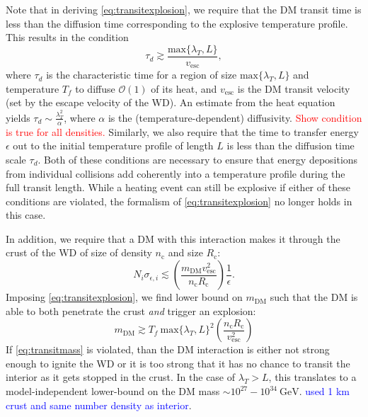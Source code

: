 \documentclass[twocolumn,showpacs,preprintnumbers,amsmath,amssymb,prd]{revtex4}
\newcommand{\OO}{\mathcal{O}}
\newcommand{\GeV}{\text{GeV}}
\def\r{\right)}
\def\l{\left(}
\begin{document}
Note that in deriving \eqref{eq:transitexplosion}, we require that the DM transit time is less than the diffusion time corresponding to the explosive temperature profile. This results in the condition
\begin{equation}
\tau_d \gtrsim \frac{\text{max}\{\lambda_T, L\}}{v_\text{esc}},
\end{equation}
where $\tau_d$ is the characteristic time for a region of size $\text{max}\{\lambda_T, L\}$ and temperature $T_f$ to diffuse $\OO(1)$ of its heat, and $v_\text{esc}$ is the DM transit velocity (set by the escape velocity of the WD). An estimate from the heat equation yields $\tau_d \sim \frac{\lambda_T^2}{\alpha}$, where $\alpha$ is the (temperature-dependent) diffusivity. \textcolor{red}{Show condition is true for all densities.} Similarly, we also require that the time to transfer energy $\epsilon$ out to the initial temperature profile of length $L$ is less than the diffusion time scale $\tau_d$. Both of these conditions are necessary to ensure that energy depositions from individual collisions add coherently into a temperature profile during the full transit length. While a heating event can still be explosive if either of these conditions are violated, the formalism of \eqref{eq:transitexplosion} no longer holds in this case.

In addition, we require that a DM with this interaction makes it through the crust of the WD of size of density $n_{\text{c}}$ and size $R_{\text{c}}$:
\begin{equation}
N_i \sigma_{\epsilon,i} \lesssim \l \frac{m_{\text{DM}} v_{\text{esc}}^2}{n_{\text{c}} R_{\text{c}}} \r \frac{1}{\epsilon}.
\end{equation}
Imposing \eqref{eq:transitexplosion}, we find lower bound on $m_{\text{DM}}$ such that the DM is able to both penetrate the crust \emph{and} trigger an explosion:
\begin{equation}
\label{eq:transitmass}
m_{\text{DM}} \gtrsim  T_f ~\text{max}\{\lambda_T, L\}^2 \l \frac{n_{\text{c}} R_{\text{c}}}{v_{\text{esc}}^2} \r
\end{equation}
If \eqref{eq:transitmass} is violated, than the DM interaction is either not strong enough to ignite the WD or it is too strong that it has no chance to transit the interior as it gets stopped in the crust. In the case of $\lambda_T > L$, this translates to a model-independent lower-bound on the DM mass $\sim 10^{27} - 10^{34} ~\GeV$. \textcolor{blue}{used 1 km crust and same number density as interior}.
\end{document}
